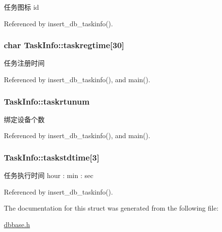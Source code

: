 任务图标 id 



Referenced by insert\-\_\-db\-\_\-taskinfo().

\hypertarget{structTaskInfo_af4123b5a228c33d071e00474447e3a7b}{
\subsubsection[{taskregtime}]{\setlength{\rightskip}{0pt plus 5cm}char Task\-Info\-::taskregtime\mbox{[}30\mbox{]}}}\label{structTaskInfo_af4123b5a228c33d071e00474447e3a7b}


任务注册时间 



Referenced by insert\-\_\-db\-\_\-taskinfo(), and main().

\hypertarget{structTaskInfo_a0bfa1e0ae661b9841bd77b14b8002c2a}{
\subsubsection[{taskrtunum}]{ Task\-Info\-::taskrtunum}}\label{structTaskInfo_a0bfa1e0ae661b9841bd77b14b8002c2a}


绑定设备个数 



Referenced by insert\-\_\-db\-\_\-taskinfo(), and main().

\hypertarget{structTaskInfo_a82ca17b1ed9c9059cf624032fd25a15d}{
\subsubsection[{taskstdtime}]{ Task\-Info\-::taskstdtime\mbox{[}3\mbox{]}}}\label{structTaskInfo_a82ca17b1ed9c9059cf624032fd25a15d}


任务执行时间 hour \-: min \-: sec 



Referenced by insert\-\_\-db\-\_\-taskinfo().



The documentation for this struct was generated from the following file\-:\begin{DoxyCompactItemize}
\item 
\hyperlink{dbbase_8h}{dbbase.\-h}\end{DoxyCompactItemize}
